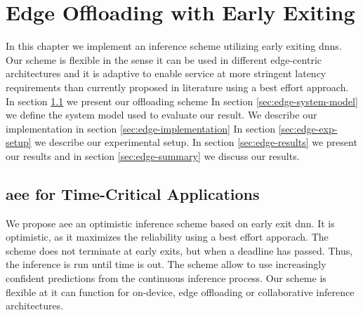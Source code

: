 \hypertarget{earlyexiting}{%
	\chapter{Edge Offloading with Early Exiting}\label{ch:edgeoffloading}}
\thispagestyle{fancy}

In this chapter we implement an inference scheme utilizing early exiting \gls{dnn}s. Our scheme is flexible in the sense it can be used in different edge-centric architectures and it is adaptive to enable service at more stringent latency requirements than currently proposed in literature using a best effort approach. In section \ref{sec:edge-aee} we present our offloading scheme In section \ref{sec:edge-system-model} we define the system model used to evaluate our result. We describe our implementation in section \ref{sec:edge-implementation} In section \ref{sec:edge-exp-setup} we describe our experimental setup. In section \ref{sec:edge-results} we present our results and in section \ref{sec:edge-summary} we discuss our results.

\section{\acrfull{aee} for Time-Critical Applications} \label{sec:edge-aee}

We propose \acrfull{aee} an optimistic inference scheme based on early exit \gls{dnn}. It is optimistic, as it maximizes the reliability using a best effort apporach. The scheme does not terminate at early exits, but when a deadline has passed. Thus, the inference is run until time is out. The scheme  allow to use increasingly confident predictions from the continuous inference process. Our scheme is flexible at it can function for on-device, edge offloading or collaborative inference architectures. 

